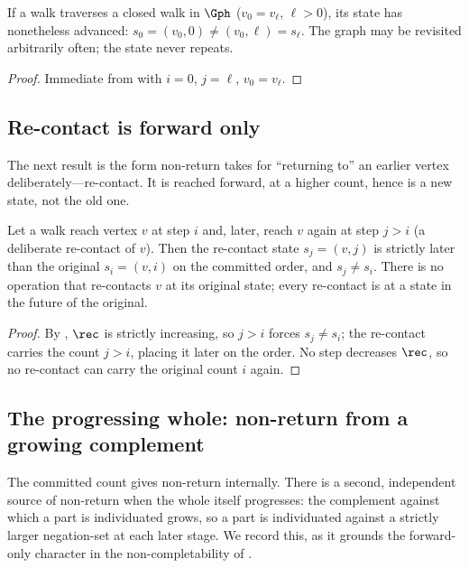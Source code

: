 \begin{corollary}
\label{cor:cycles}
If a walk traverses a closed walk in $\Gph$ \textup{(}$v_0=v_\ell$, $\ell>0$\textup{)},
its state has nonetheless advanced: $s_0=(v_0,0)\neq(v_0,\ell)=s_\ell$. The graph
may be revisited arbitrarily often; the state never repeats.
\end{corollary}

\begin{proof}
Immediate from  with $i=0$, $j=\ell$, $v_0=v_\ell$.
\end{proof}

\subsection{Re-contact is forward only}

The next result is the form non-return takes for ``returning to'' an earlier
vertex deliberately---re-contact. It is reached forward, at a higher count, hence
is a new state, not the old one.

\begin{proposition}
\label{prop:recontact}
Let a walk reach vertex $v$ at step $i$ and, later, reach $v$ again at step
$j>i$ \textup{(}a deliberate re-contact of $v$\textup{)}. Then the re-contact
state $s_j=(v,j)$ is strictly later than the original $s_i=(v,i)$ on the
committed order, and $s_j\neq s_i$. There is no operation that re-contacts $v$ at
its original state; every re-contact is at a state in the future of the original.
\end{proposition}

\begin{proof}
By , $\rec$ is strictly increasing, so $j>i$ forces
$s_j\neq s_i$; the re-contact carries the count $j>i$, placing it later on the
order. No step decreases $\rec$, so no re-contact can carry the original count
$i$ again.
\end{proof}

\subsection{The progressing whole: non-return from a growing complement}

The committed count gives non-return internally. There is a second, independent
source of non-return when the whole itself progresses: the complement against
which a part is individuated grows, so a part is individuated against a strictly
larger negation-set at each later stage. We record this, as it grounds the
forward-only character in the non-completability of .

